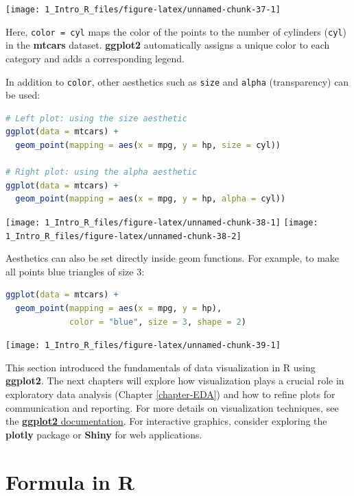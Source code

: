 \documentclass[
  11pt,
]{book}
\newcommand{\passthrough}[1]{#1}
\theoremstyle{definition}
\theoremstyle{definition}
\theoremstyle{definition}
\theoremstyle{definition}
\theoremstyle{remark}
\begin{document}
\begin{center}\texttt{[image: 1\_Intro\_R\_files/figure-latex/unnamed-chunk-37-1]} \end{center}

Here, \passthrough{\lstinline!color = cyl!} maps the color of the points to the number of cylinders (\passthrough{\lstinline!cyl!}) in the \textbf{mtcars} dataset. \textbf{ggplot2} automatically assigns a unique color to each category and adds a corresponding legend.

In addition to \passthrough{\lstinline!color!}, other aesthetics such as \passthrough{\lstinline!size!} and \passthrough{\lstinline!alpha!} (transparency) can be used:

\begin{lstlisting}[language=R]
# Left plot: using the size aesthetic
ggplot(data = mtcars) +
  geom_point(mapping = aes(x = mpg, y = hp, size = cyl))

# Right plot: using the alpha aesthetic
ggplot(data = mtcars) +
  geom_point(mapping = aes(x = mpg, y = hp, alpha = cyl))
\end{lstlisting}

\texttt{[image: 1\_Intro\_R\_files/figure-latex/unnamed-chunk-38-1]} \texttt{[image: 1\_Intro\_R\_files/figure-latex/unnamed-chunk-38-2]}

Aesthetics can also be set directly inside geom functions. For example, to make all points blue triangles of size 3:

\begin{lstlisting}[language=R]
ggplot(data = mtcars) +
  geom_point(mapping = aes(x = mpg, y = hp), 
             color = "blue", size = 3, shape = 2)
\end{lstlisting}

\begin{center}\texttt{[image: 1\_Intro\_R\_files/figure-latex/unnamed-chunk-39-1]} \end{center}

This section introduced the fundamentals of data visualization in R using \textbf{ggplot2}. The next chapters will explore how visualization plays a crucial role in exploratory data analysis (Chapter \ref{chapter-EDA}) and how to refine plots for communication and reporting. For more details on visualization techniques, see the \href{https://ggplot2.tidyverse.org}{\textbf{ggplot2} documentation}. For interactive graphics, consider exploring the \textbf{plotly} package or \textbf{Shiny} for web applications.

\section{Formula in R}\label{sec-formula-in-R}
\end{document}
